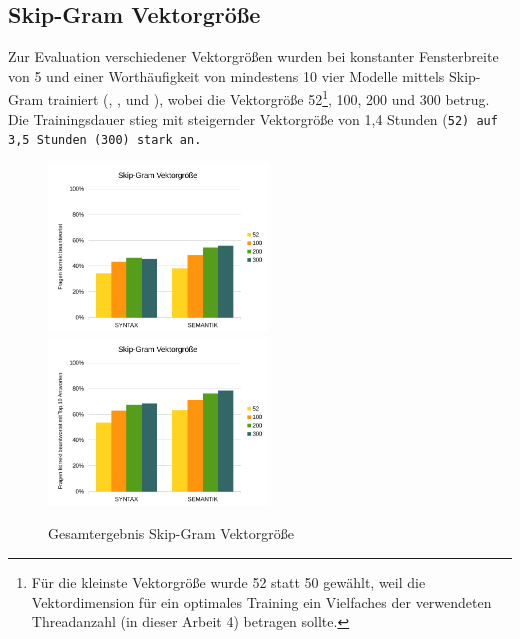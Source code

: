\subsection{Skip-Gram Vektorgröße}\label{ss.sgvektorgroesse}
Zur Evaluation verschiedener Vektorgrößen wurden bei konstanter Fensterbreite von 5 und einer Worthäufigkeit von mindestens 10 vier Modelle mittels Skip-Gram trainiert (, ,  und ), wobei die Vektorgröße 52\footnote{Für die kleinste Vektorgröße wurde 52 statt 50 gewählt, weil die Vektordimension für ein optimales Training ein Vielfaches der verwendeten Threadanzahl (in dieser Arbeit 4) betragen sollte.}, 100, 200 und 300 betrug. Die Trainingsdauer stieg mit steigernder Vektorgröße von 1,4 Stunden (\tt{52}) auf 3,5 Stunden (\tt{300}) stark an.

\begin{figure}[H]
\begin{adjustwidth}{-4mm}{-4mm}
\centering
{}
{\includegraphics[width=0.52\textwidth]{images/diagram_sgvector_correct_all}}
{\includegraphics[width=0.52\textwidth]{images/diagram_sgvector_top10_all}}
\caption[Gesamtergebnis Skip-Gram Vektorgröße]{Gesamtergebnis Skip-Gram Vektorgröße}\label{img.diagram_sgvector_all}
\end{adjustwidth}
\end{figure}

